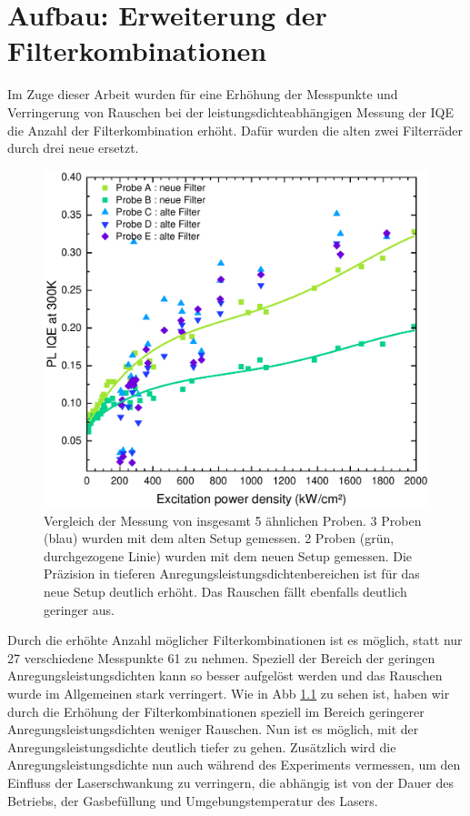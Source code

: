 \chapter{Aufbau: Erweiterung der Filterkombinationen}
\thispagestyle{fancy}

Im Zuge dieser Arbeit wurden für eine Erhöhung der Messpunkte und Verringerung von Rauschen bei der leistungsdichteabhängigen Messung der IQE die Anzahl der Filterkombination erhöht. Dafür wurden die alten zwei Filterräder durch drei neue ersetzt. 
%
\begin{figure}[ht!]
    \centering
    \begin{minipage}[t]{1\linewidth}
        \centering
        \includegraphics[width = 0.49\linewidth]{Bilder/AuswertungNovemeberKorr1VergleichFilter.pdf}
        \caption{Vergleich der Messung von insgesamt 5 ähnlichen Proben. 3 Proben (blau) wurden mit dem alten Setup gemessen. 2 Proben (grün, durchgezogene Linie) wurden mit dem neuen Setup gemessen. Die Präzision in tieferen Anregungsleistungsdichtenbereichen ist für das neue Setup deutlich erhöht. Das Rauschen fällt ebenfalls deutlich geringer aus. }
        \label{fig:vergleichFilter}
    \end{minipage}
\end{figure}
%
\newpage
Durch die erhöhte Anzahl möglicher Filterkombinationen ist es möglich, statt nur 27 verschiedene Messpunkte 61 zu nehmen. Speziell der Bereich der geringen Anregungsleistungsdichten kann so besser aufgelöst werden und das Rauschen wurde im Allgemeinen stark verringert. 
Wie in Abb \ref{fig:vergleichFilter} zu sehen ist, haben wir durch die Erhöhung der Filterkombinationen speziell im Bereich geringerer Anregungsleistungsdichten weniger Rauschen. Nun ist es möglich, mit der Anregungsleistungsdichte deutlich tiefer zu gehen. Zusätzlich wird die Anregungsleistungsdichte nun auch während des Experiments vermessen, um den Einfluss der Laserschwankung zu verringern, die abhängig ist von der Dauer des Betriebs, der Gasbefüllung und Umgebungstemperatur des Lasers. 
